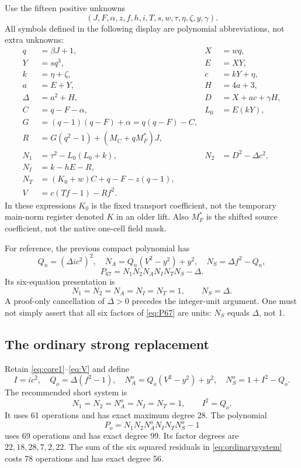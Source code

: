 \documentclass[11pt]{article}
\begin{document}
Use the fifteen positive unknowns
\[
(J,F,\alpha,z,f,h,i,T,s,w,\tau,\eta,\zeta,y,\gamma).
\]
All symbols defined in the following display are polynomial abbreviations, not extra unknowns:
\begin{align}
q&=\beta J+1,&X&=wq,\label{eq:core1}\\
Y&=sq^3,&E&=XY,\\
k&=\eta+\zeta,&c&=kY+\eta,\\
a&=E+Y,&H&=4a+3,\\
\Delta&=a^2+H,&D&=X+ac+\gamma H,\\
C&=q-F-\alpha,&L_0&=E(kY),\\
G&=(q-1)(q-F)+\alpha=q(q-F)-C,\\
R&=G(q^2-1)+(M_C+qM_F^*)J,\\
N_1&=\tau^2-L_0(L_0+k),&N_2&=D^2-\Delta c^2,\\
N_I&=k-hE-R,\\
N_T&=(K_0+w)C+q-F-z(q-1),\\
V&=c(Tf-1)-Rf^2.\label{eq:V}
\end{align}
In these expressions $K_0$ is the fixed transport coefficient, not the temporary main-norm register denoted $K$ in an older lift. Also $M_F^*$ is the shifted source coefficient, not the native one-cell field mask.

For reference, the previous compact polynomial has
\[
Q_n=(\Delta i c^2)^2,\quad
N_A=Q_n(V^2-y^2)+y^2,\quad N_S=\Delta f^2-Q_n,
\]
\begin{equation}\label{eq:P67}
P_{67}=N_1N_2N_AN_IN_TN_S-\Delta.
\end{equation}
Its six-equation presentation is
\[
N_1=N_2=N_A=N_I=N_T=1,\qquad N_S=\Delta.
\]
A proof-only cancellation of $\Delta>0$ precedes the integer-unit argument. One must not simply assert that all six factors of \eqref{eq:P67} are units: $N_S$ equals $\Delta$, not 1.

\subsection{The ordinary strong replacement}

Retain \eqref{eq:core1}--\eqref{eq:V} and define
\[
I=ic^2,\quad Q_o=\Delta(f^2-1),\quad
N_A^o=Q_o(V^2-y^2)+y^2,\quad N_S^o=1+I^2-Q_o.
\]
The recommended short system is
\begin{equation}\label{eq:ordinarysystem}
\boxed{N_1=N_2=N_A^o=N_I=N_T=1,\qquad I^2=Q_o.}
\end{equation}
It uses 61 operations and has exact maximum degree 28. The polynomial
\[
P_o=N_1N_2N_A^oN_IN_TN_S^o-1
\]
uses 69 operations and has exact degree 99. Its factor degrees are
$22,18,28,7,2,22$. The sum of the six squared residuals in
\eqref{eq:ordinarysystem} costs 78 operations and has exact degree 56.
\end{document}
